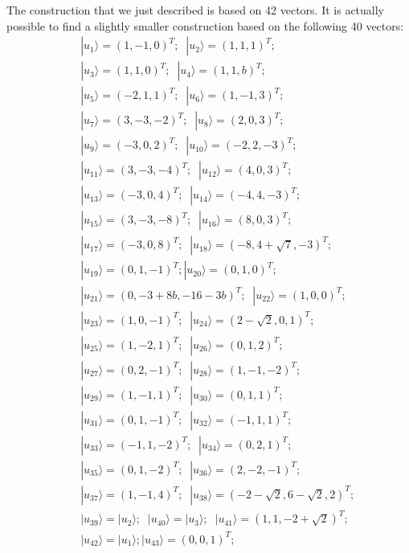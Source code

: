 \documentclass[twocolumn, a4paper, superscriptaddress,nofootinbib, accepted=2020-08-07, hyperref]{quantumarticle}
\begin{document}
The construction that we just described is based on 42 vectors. It is actually possible to find a slightly smaller construction based on the following 40 vectors:
\begin{eqnarray}
&&|u_1 \rangle = (1,-1,0)^T; \; \; |u_2 \rangle = (1,1,1)^T;\nonumber \\
&&|u_3 \rangle = (1,1,0)^T; \; \; |u_4 \rangle = (1,1,b)^T; \nonumber \\
&&|u_5 \rangle = (-2,1,1)^T; \; \; |u_6 \rangle = (1,-1,3)^T; \nonumber \\
&&|u_7 \rangle = (3,-3,-2)^T; \; \; |u_8 \rangle = (2,0,3)^T;\nonumber \\
&& |u_9 \rangle = (-3,0,2)^T; \;\;|u_{10} \rangle = (-2,2,-3)^T; \nonumber \\
&& |u_{11} \rangle = (3,-3,-4)^T; \; \; |u_{12} \rangle = (4,0,3)^T; \nonumber \\
&&|u_{13} \rangle = (-3,0,4)^T; \; \; |u_{14} \rangle = (-4,4,-3)^T;  \nonumber \\
&&|u_{15} \rangle = (3,-3,-8)^T; \; \; |u_{16} \rangle = (8,0,3)^T; \nonumber \\
&& |u_{17} \rangle = (-3,0,8)^T; \;\;|u_{18} \rangle = (-8,4+\sqrt{7},-3)^T;\nonumber \\
&&|u_{19} \rangle = (0,1,-1)^T; |u_{20} \rangle = (0,1,0)^T; \nonumber \\
&& |u_{21} \rangle = (0,-3+8b,-16-3b)^T; \;\;|u_{22} \rangle = (1,0,0)^T; \nonumber \\
&&|u_{23} \rangle = (1,0,-1)^T; \;\; |u_{24} \rangle = (2-\sqrt{2},0,1)^T; \nonumber \\
&&|u_{25} \rangle = (1,-2,1)^T; \; \; |u_{26} \rangle = (0,1,2)^T; \nonumber \\
&& |u_{27} \rangle = (0,2,-1)^T; \;\; |u_{28} \rangle = (1,-1,-2)^T; \nonumber \\
&& |u_{29} \rangle = (1,-1,1)^T; \; \; |u_{30} \rangle = (0,1,1)^T; \nonumber \\
&&|u_{31} \rangle = (0,1,-1)^T; \;\; |u_{32} \rangle = (-1,1,1)^T; \nonumber \\
&&|u_{33} \rangle = (-1,1,-2)^T; \;\; |u_{34} \rangle = (0,2,1)^T; \nonumber \\
&& |u_{35} \rangle = (0,1,-2)^T; \; \; |u_{36} \rangle = (2,-2,-1)^T; \nonumber \\
&&|u_{37} \rangle = (1,-1,4)^T; \; \;  |u_{38} \rangle = (-2-\sqrt{2},6-\sqrt{2},2)^T;  \nonumber \\
&& |u_{39} \rangle = |u_2 \rangle;\; \; |u_{40} \rangle = |u_3 \rangle; \; \; |u_{41} \rangle = (1,1,-2+\sqrt{2})^T; \nonumber \\
&& |u_{42} \rangle = |u_1 \rangle; |u_{43} \rangle = (0,0,1)^T; \nonumber 
\end{eqnarray}
\end{document}
